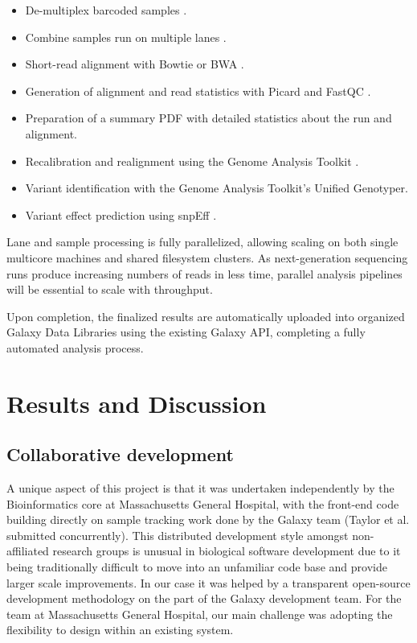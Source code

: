 \documentclass[10pt]{bmc_article}
\newenvironment{bmcformat}{\begin{raggedright}\baselineskip20pt\sloppy\setboolean{publ}{false}}{\end{raggedright}\baselineskip20pt\sloppy}
\begin{document}
\begin{bmcformat}
\begin{itemize}
  \item De-multiplex barcoded samples \cite{cock_biopython:_2009}.
  \item Combine samples run on multiple lanes \cite{cock_biopython:_2009}.
  \item Short-read alignment with Bowtie or BWA
    \cite{langmead_ultrafast_2009,li_fast_2009}.
  \item Generation of alignment and read statistics with Picard and
    FastQC \cite{_picard_????,fastqc}.
  \item Preparation of a summary PDF with detailed statistics
    about the run and alignment.
  \item Recalibration and realignment using the Genome Analysis
    Toolkit
    \cite{mckenna_genome_2010,_pysam_????,gautier_intuitive_2010}.
  \item Variant identification with the Genome Analysis Toolkit's
    Unified Genotyper.
  \item Variant effect prediction using snpEff \cite{_snpeff_????}.
\end{itemize}

Lane and sample processing is fully parallelized, allowing scaling on
both single multicore machines and shared filesystem clusters. As
next-generation sequencing runs produce increasing numbers of reads in
less time, parallel analysis pipelines will be essential to scale with
throughput.

Upon completion, the finalized results are
automatically uploaded into organized Galaxy Data Libraries using the
existing Galaxy API, completing a fully automated analysis process.


\section*{Results and Discussion}

\subsection*{Collaborative development}

A unique aspect of this project is that it was undertaken
independently by the Bioinformatics core at Massachusetts General
Hospital, with the front-end code building directly on sample tracking
work done by the Galaxy team (Taylor et al. submitted concurrently).
This distributed development style
amongst non-affiliated research groups is unusual in biological software
development due to it being traditionally difficult to move into an
unfamiliar code base and provide larger scale improvements. In our
case it was helped by a transparent open-source development
methodology on the part of the Galaxy development team. For the team
at Massachusetts General Hospital, our main challenge was adopting
the flexibility to design within an existing system.


\end{bmcformat}
\end{document}
